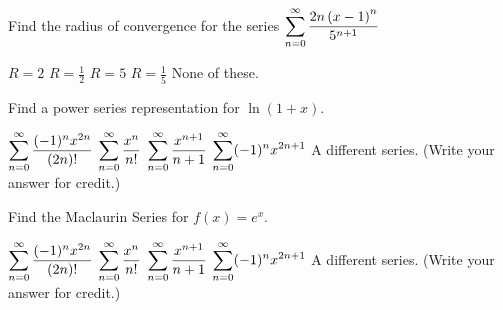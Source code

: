 \documentclass[12pt]{exam}
\newcommand{\ds}{\ensuremath{\displaystyle}}
\begin{document}
\begin{center}
\end{center}
\vspace{0.1in}

\begin{questions}

\setcounter{question}{0}
\question[10]
Find the radius of convergence for the series
$\ds \sum_{n=0}^{\infty} \frac{2n\left(x-1\right)^n}{5^{n+1}}$

\begin{checkboxes}
\choice $R=2$
\choice $R=\frac{1}{2}$
\CorrectChoice $R=5$
\choice $R=\frac{1}{5}$
\choice None of these.
\end{checkboxes}

\vfill

\question[10]
Find a power series representation for $\ln\left(1+x\right)$.

\begin{checkboxes}
\choice $\ds\sum_{n=0}^\infty \frac{(-1)^nx^{2n}}{(2n)!}$
\choice $\ds\sum_{n=0}^\infty \frac{x^n}{n!}$
\CorrectChoice $\ds\sum_{n=0}^\infty \frac{x^{n+1}}{n+1}$
\choice $\ds\sum_{n=0}^\infty (-1)^nx^{2n+1}$
\choice A different series. (Write your answer for credit.)
\end{checkboxes}

\vfill

\question[5]
Find the Maclaurin Series for $f(x) = e^x$.

\begin{checkboxes}
\choice $\ds\sum_{n=0}^\infty \frac{(-1)^nx^{2n}}{(2n)!}$
\CorrectChoice $\ds\sum_{n=0}^\infty \frac{x^n}{n!}$
\choice $\ds\sum_{n=0}^\infty \frac{x^{n+1}}{n+1}$
\choice $\ds\sum_{n=0}^\infty (-1)^nx^{2n+1}$
\choice A different series. (Write your answer for credit.)
\end{checkboxes}

\vfill

\end{questions}
\end{document}
